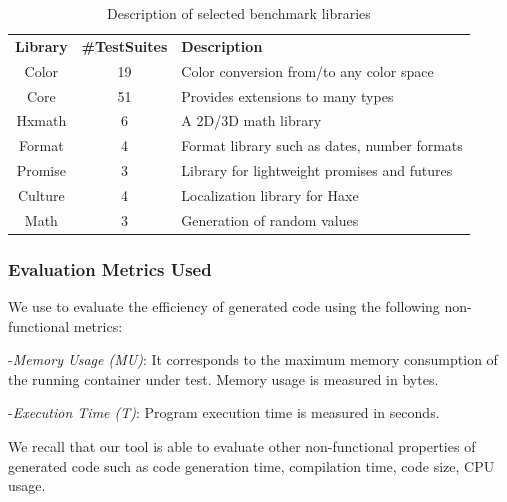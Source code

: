 \begin{table}[h]
	\centering

	\begin{tabular}{|c|c|p{4.3cm}|}
		\hline
		\textbf{Library} & \textbf{\#TestSuites} & \textbf{Description} \\
		\hhline{|=|=|=|}
		Color  &  19 &  Color conversion from/to any color space   \\ \hline
		Core & 51  & Provides extensions to many types  \\ \hline
		Hxmath & 6  & A 2D/3D math library  \\ \hline
	    Format  &  4 & Format library such as dates, number formats   \\ \hline
		Promise & 3  & Library for lightweight promises and futures  \\ \hline
		Culture & 4  & Localization library for Haxe \\ \hline
		Math & 3  & Generation of random values \\ \hline
	\end{tabular}
		\caption{Description of selected benchmark libraries}
		\label{my-label}
\end{table}

\subsubsection{Evaluation Metrics Used}
We use to evaluate the efficiency of generated code using the following non-functional metrics:

-\textit{Memory Usage (MU)}:
It corresponds to the maximum memory consumption of the running container under test. Memory usage is measured in bytes.

-\textit{Execution Time (T)}:
Program execution time is measured in seconds.

We recall that our tool is able to evaluate other non-functional properties of generated code such as code generation time, compilation time, code size, CPU usage.
 
